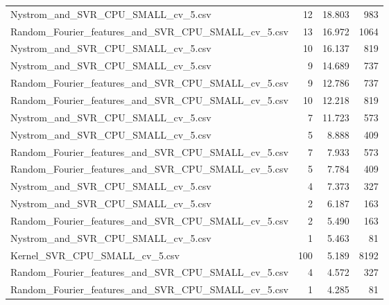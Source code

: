 \begin{tabularx}{\textwidth}{lrrr}
                Nystrom\_and\_SVR\_CPU\_SMALL\_cv\_5.csv &       12 &              18.803 &           983 \\
Random\_Fourier\_features\_and\_SVR\_CPU\_SMALL\_cv\_5.csv &       13 &              16.972 &          1064 \\
                Nystrom\_and\_SVR\_CPU\_SMALL\_cv\_5.csv &       10 &              16.137 &           819 \\
                Nystrom\_and\_SVR\_CPU\_SMALL\_cv\_5.csv &        9 &              14.689 &           737 \\
Random\_Fourier\_features\_and\_SVR\_CPU\_SMALL\_cv\_5.csv &        9 &              12.786 &           737 \\
Random\_Fourier\_features\_and\_SVR\_CPU\_SMALL\_cv\_5.csv &       10 &              12.218 &           819 \\
                Nystrom\_and\_SVR\_CPU\_SMALL\_cv\_5.csv &        7 &              11.723 &           573 \\
                Nystrom\_and\_SVR\_CPU\_SMALL\_cv\_5.csv &        5 &               8.888 &           409 \\
Random\_Fourier\_features\_and\_SVR\_CPU\_SMALL\_cv\_5.csv &        7 &               7.933 &           573 \\
Random\_Fourier\_features\_and\_SVR\_CPU\_SMALL\_cv\_5.csv &        5 &               7.784 &           409 \\
                Nystrom\_and\_SVR\_CPU\_SMALL\_cv\_5.csv &        4 &               7.373 &           327 \\
                Nystrom\_and\_SVR\_CPU\_SMALL\_cv\_5.csv &        2 &               6.187 &           163 \\
Random\_Fourier\_features\_and\_SVR\_CPU\_SMALL\_cv\_5.csv &        2 &               5.490 &           163 \\
                Nystrom\_and\_SVR\_CPU\_SMALL\_cv\_5.csv &        1 &               5.463 &            81 \\
                     Kernel\_SVR\_CPU\_SMALL\_cv\_5.csv &      100 &               5.189 &          8192 \\
Random\_Fourier\_features\_and\_SVR\_CPU\_SMALL\_cv\_5.csv &        4 &               4.572 &           327 \\
Random\_Fourier\_features\_and\_SVR\_CPU\_SMALL\_cv\_5.csv &        1 &               4.285 &            81 \\
\bottomrule
\end{tabularx}

